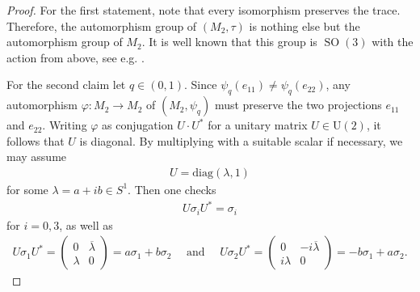 \documentclass{amsart}
\DeclareMathOperator{\SO}{SO}
\begin{document}
\begin{proof}
    For the first statement, note that every isomorphism preserves the trace. Therefore, the automorphism group of $(M_2, \tau)$ is nothing else but the automorphism group of $M_2$. It is well known that this group is $\SO(3)$ with the action from above, see e.g. \cite{soltan_quantum_2010}.
    
    For the second claim let $q \in (0,1)$.
    Since $\psi_q(e_{11}) \neq \psi_q(e_{22})$, any automorphism $\varphi: M_2 \to M_2$ of $(M_2, \psi_q)$ must preserve the two projections $e_{11}$ and $e_{22}$. Writing $\varphi$ as conjugation $U \cdot U^\ast$ for a unitary matrix $U \in \mathrm{U}(2)$, it follows that $U$ is diagonal. By multiplying with a suitable scalar if necessary, we may assume 
    \begin{align*}
        U = \mathrm{diag}(\lambda, 1)
    \end{align*}
    for some $\lambda = a + ib \in S^1$. Then one checks 
    \begin{align*}
        U \sigma_i U^\ast = \sigma_i
    \end{align*}
    for $i=0,3$, as well as
    \begin{align*}
        U \sigma_1 U^\ast = \begin{pmatrix}
            0 & \overline{\lambda} \\
            \lambda & 0
        \end{pmatrix}
        = a \sigma_1 + b \sigma_2
        \quad \text{ and } \quad
        U \sigma_2 U^\ast = \begin{pmatrix}
            0 & -i \overline{\lambda} \\
            i \lambda & 0
        \end{pmatrix}
        = - b \sigma_1 + a \sigma_2.
    \end{align*}
\end{proof}
\end{document}
